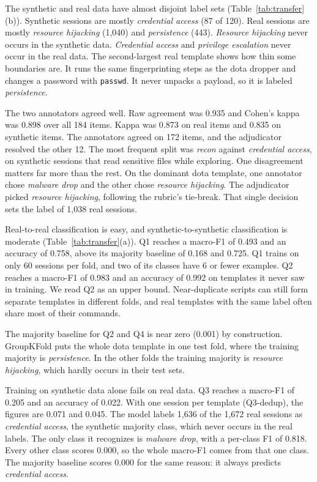 \documentclass[conference]{IEEEtran}
\newcommand{\lbl}[1]{\textit{#1}}
\newcommand{\cmd}[1]{\texttt{#1}}
\begin{document}
The synthetic and real data have almost disjoint label sets (Table~\ref{tab:transfer}(b)). Synthetic sessions are mostly \lbl{credential access} (87 of 120). Real sessions are mostly \lbl{resource hijacking} (1,040) and \lbl{persistence} (443). \lbl{Resource hijacking} never occurs in the synthetic data. \lbl{Credential access} and \lbl{privilege escalation} never occur in the real data. The second-largest real template shows how thin some boundaries are. It runs the same fingerprinting steps as the dota dropper and changes a password with \cmd{passwd}. It never unpacks a payload, so it is labeled \lbl{persistence}.

The two annotators agreed well. Raw agreement was 0.935 and Cohen's kappa was 0.898 over all 184 items. Kappa was 0.873 on real items and 0.835 on synthetic items. The annotators agreed on 172 items, and the adjudicator resolved the other 12. The most frequent split was \lbl{recon} against \lbl{credential access}, on synthetic sessions that read sensitive files while exploring. One disagreement matters far more than the rest. On the dominant dota template, one annotator chose \lbl{malware drop} and the other chose \lbl{resource hijacking}. The adjudicator picked \lbl{resource hijacking}, following the rubric's tie-break. That single decision sets the label of 1,038 real sessions.

Real-to-real classification is easy, and synthetic-to-synthetic classification is moderate (Table~\ref{tab:transfer}(a)). Q1 reaches a macro-F1 of 0.493 and an accuracy of 0.758, above its majority baseline of 0.168 and 0.725. Q1 trains on only 60 sessions per fold, and two of its classes have 6 or fewer examples. Q2 reaches a macro-F1 of 0.983 and an accuracy of 0.992 on templates it never saw in training. We read Q2 as an upper bound. Near-duplicate scripts can still form separate templates in different folds, and real templates with the same label often share most of their commands.

The majority baseline for Q2 and Q4 is near zero (0.001) by construction. GroupKFold puts the whole dota template in one test fold, where the training majority is \lbl{persistence}. In the other folds the training majority is \lbl{resource hijacking}, which hardly occurs in their test sets.

Training on synthetic data alone fails on real data. Q3 reaches a macro-F1 of 0.205 and an accuracy of 0.022. With one session per template (Q3-dedup), the figures are 0.071 and 0.045. The model labels 1,636 of the 1,672 real sessions as \lbl{credential access}, the synthetic majority class, which never occurs in the real labels. The only class it recognizes is \lbl{malware drop}, with a per-class F1 of 0.818. Every other class scores 0.000, so the whole macro-F1 comes from that one class. The majority baseline scores 0.000 for the same reason: it always predicts \lbl{credential access}.
\end{document}
